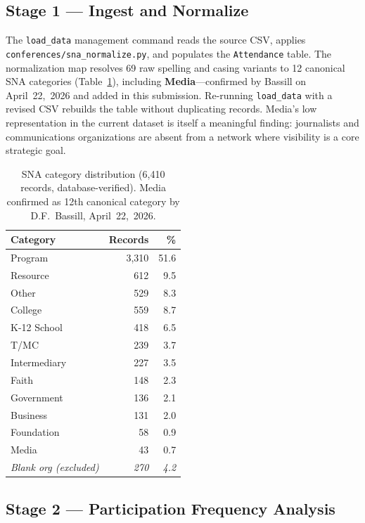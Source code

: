 \documentclass[10pt,twocolumn,letterpaper]{article}
\begin{document}
\subsection{Stage 1 — Ingest and Normalize}

The \texttt{load\_data} management command reads the source CSV,
applies \texttt{conferences/sna\_normalize.py}, and populates the
\texttt{Attendance} table. The normalization map resolves 69 raw
spelling and casing variants to 12 canonical SNA categories
(Table~\ref{tab:sna}), including \textbf{Media}---confirmed by Bassill
on April~22,~2026 and added in this submission. Re-running
\texttt{load\_data} with a revised CSV rebuilds the table without
duplicating records. Media's low representation in the current dataset
is itself a meaningful finding: journalists and communications
organizations are absent from a network where visibility is
a core strategic goal.

\begin{table}[t]
\small
\caption{SNA category distribution (6,410 records, database-verified).
  Media confirmed as 12th canonical category by D.F.\ Bassill, April~22,~2026.}
\label{tab:sna}
\begin{tabular}{lrr}
\toprule
Category & Records & \% \\
\midrule
Program      & 3,310 & 51.6 \\
Resource     &   612 &  9.5 \\
Other        &   529 &  8.3 \\
College      &   559 &  8.7 \\
K-12 School  &   418 &  6.5 \\
T/MC         &   239 &  3.7 \\
Intermediary &   227 &  3.5 \\
Faith        &   148 &  2.3 \\
Government   &   136 &  2.1 \\
Business     &   131 &  2.0 \\
Foundation   &    58 &  0.9 \\
Media        &    43 &  0.7 \\
\midrule
\textit{Blank org (excluded)} & \textit{270} & \textit{4.2} \\
\bottomrule
\end{tabular}
\end{table}

\subsection{Stage 2 — Participation Frequency Analysis}
\end{document}
